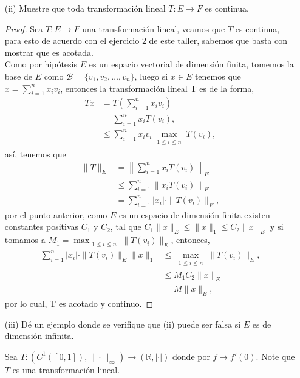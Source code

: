 \begin{enumerate}
\begin{proof}
Luego, por la definición de equivalencia de normas, $\|\cdot\|_a$ y $\|\cdot\|_1$ son equivalentes.


        
    \end{proof}
  
   \item[(ii)] Muestre que toda transformación lineal $T : E \to F$ es continua.
    \begin{proof}
    Sea $T: E\rightarrow F$ una transformación lineal, veamos que $T$ es continua, para esto de acuerdo con el ejercicio $2$ de este taller, sabemos que basta con mostrar que es acotada.\\

    Como por hipótesis $E$ es un espacio vectorial de dimensión finita, tomemos la base de $E$ como $\mathcal{B}=\{v_1,v_2,\dots, v_n\}$, luego si $x\in E$ tenemos que $x=\displaystyle\sum_{i=1}^{n}x_iv_i$, entonces la transformación lineal T es de la forma,
      \begin{align*}
           Tx&=T\left( \displaystyle\sum_{i=1}^{n} x_i v_i\right) \\
           &=\displaystyle\sum_{i=1}^{n} x_i T(v_i),\\
           &\leq\displaystyle\sum_{i=1}^{n} x_i v_i \max_{\substack{1\leq i\leq n}} T(v_i),
        \end{align*} 
    así, tenemos que
    \begin{align*}
\|T\|_E 
&= \left\|\sum_{i=1}^{n} x_i T(v_i)\right\|_E\\
&\leq \sum_{i=1}^{n} \left\|x_i T(v_i)\right\|_E\\
    & =\sum_{i=1}^{n} |x_i| \cdot \|T(v_i)\|_E,
\end{align*}
 por el punto anterior, como $E$ es un espacio de dimensión finita existen constantes positivas $C_1$ y $C_2$, tal que $C_1\|x\|_E\leq\|x\|_1\leq C_2\|x\|_E$ y si tomamos a $M_1=\max_{\substack{1\leq i\leq n}} \|T(v_i)\|_E$, entonces,
 \begin{align*}
     \sum_{i=1}^{n} |x_i| \cdot \|T(v_i)\|_E\|x\|_1 &\leq\max_{\substack{1\leq i \leq n}} \|T(v_i)\|_E,\\
     &\leq M_1 C_2\|x\|_E\\
     &=M \|x\|_E,
 \end{align*}
 por lo cual, T es acotado y continuo.
    \end{proof}
    \item[(iii)] Dé un ejemplo donde se verifique que (ii) puede ser falsa si $E$ es de dimensión infinita.
\begin{sol}
    Sea $
T: (C^1([0,1]), \|\cdot\|_{\infty}) \longrightarrow (\mathbb{R}, |\cdot|)
$
donde por $f \mapsto f'(0)$. Note que $T$ es una transformación lineal.


\end{sol}
\end{enumerate}
